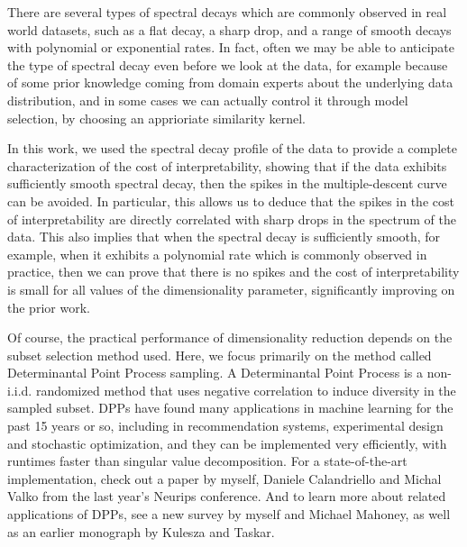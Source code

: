 \documentclass[11pt]{article}
\begin{document}
There are several types of spectral decays which are commonly
observed in real world datasets, such as a flat decay, a sharp
drop, and a  range of smooth decays with polynomial or
exponential rates. In fact, often we may be able to anticipate
the type of spectral decay even before we look at the data, for
example because of some prior knowledge coming from domain
experts about the underlying data distribution, and in some cases
we can actually control it through model selection, by choosing
an apprioriate similarity kernel.


In this work, we used the spectral decay profile of the data to
provide a complete characterization of the cost of interpretability,
showing that if the data exhibits sufficiently 
smooth spectral decay, then the spikes in the multiple-descent curve
can be avoided. In particular, this  
allows us to deduce that the spikes in the cost of
interpretability are directly correlated with sharp drops in the
spectrum of the data. This also implies that when the spectral decay is
sufficiently smooth, for example, when it exhibits a polynomial
rate which is commonly observed in practice, then we can prove
that there is no spikes and the cost of interpretability is
small for all values of the dimensionality parameter,
significantly improving on the prior work.

Of course, the practical performance of dimensionality reduction depends on
the subset selection method used. Here, we focus primarily on the method called
Determinantal Point Process sampling. %
A Determinantal Point Process is a non-i.i.d. randomized
method that uses negative correlation to induce diversity in the
sampled subset. DPPs have found many applications in machine
learning for the past 15 years or so, including in recommendation
systems, experimental design and stochastic optimization, and they can
be implemented very efficiently, with runtimes faster than singular
value decomposition. For a state-of-the-art implementation, check out
a paper by myself, Daniele Calandriello and Michal
Valko from the last year's Neurips conference. And to learn more about
related applications of DPPs, see a new 
survey by myself and Michael Mahoney, as well as an earlier monograph
by Kulesza and Taskar. 
\end{document}
